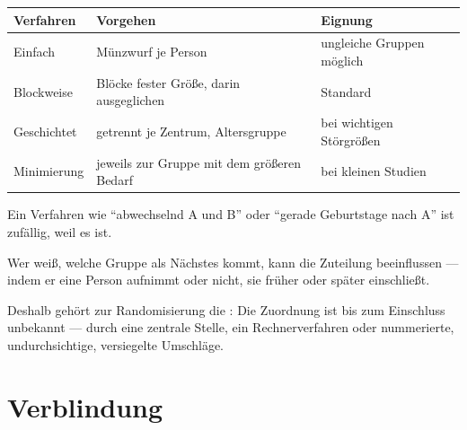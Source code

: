 \begin{merksatz}
\begin{center}
{\small
\renewcommand{\arraystretch}{1.5}
\begin{tabular}{@{}P{2.4cm}P{3.0cm}P{2.6cm}@{}}
\toprule
\textbf{Verfahren} & \textbf{Vorgehen} & \textbf{Eignung}\\
\midrule
Einfach & Münzwurf je Person & \textcolor{mittel}{ungleiche Gruppen möglich}\\
Blockweise & Blöcke fester Größe, darin ausgeglichen & \textcolor{gruen}{Standard}\\
Geschichtet & getrennt je Zentrum, Altersgruppe & \textcolor{gruen}{bei wichtigen Störgrößen}\\
Minimierung & jeweils zur Gruppe mit dem größeren Bedarf & bei kleinen Studien\\
\bottomrule
\end{tabular}}
\end{center}

Ein Verfahren wie \enquote{abwechselnd A und B} oder \enquote{gerade Geburtstage nach A} ist  zufällig, weil es  ist.

\begin{center}
\begin{minipage}{0.9\textwidth}
Wer weiß, welche Gruppe als Nächstes kommt, kann die Zuteilung beeinflussen --- indem er eine Person aufnimmt oder nicht, sie früher oder später einschließt.
\end{minipage}
\end{center}

Deshalb gehört zur Randomisierung die : Die Zuordnung ist bis zum Einschluss unbekannt --- durch eine zentrale Stelle, ein Rechnerverfahren oder nummerierte, undurchsichtige, versiegelte Umschläge.

\begin{center}
\begin{minipage}{0.88\textwidth}
\end{minipage}
\end{center}
\end{merksatz}

\section{Verblindung}

